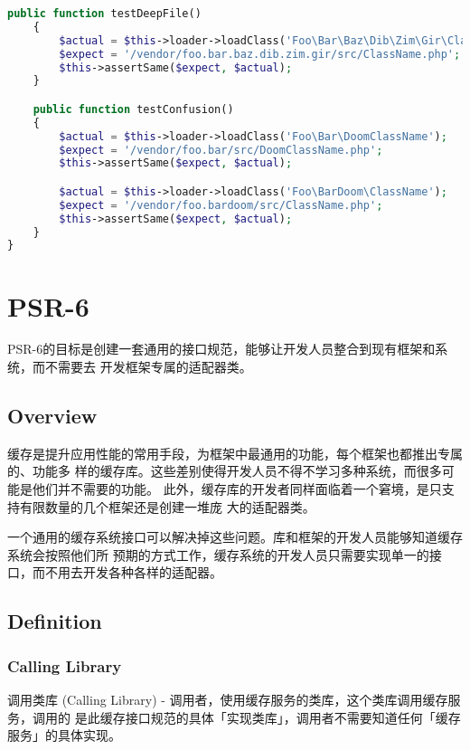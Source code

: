 \begin{lstlisting}[language=PHP]
    public function testDeepFile()
    {
        $actual = $this->loader->loadClass('Foo\Bar\Baz\Dib\Zim\Gir\ClassName');
        $expect = '/vendor/foo.bar.baz.dib.zim.gir/src/ClassName.php';
        $this->assertSame($expect, $actual);
    }

    public function testConfusion()
    {
        $actual = $this->loader->loadClass('Foo\Bar\DoomClassName');
        $expect = '/vendor/foo.bar/src/DoomClassName.php';
        $this->assertSame($expect, $actual);

        $actual = $this->loader->loadClass('Foo\BarDoom\ClassName');
        $expect = '/vendor/foo.bardoom/src/ClassName.php';
        $this->assertSame($expect, $actual);
    }
}
\end{lstlisting}

\chapter{PSR-6}

PSR-6的目标是创建一套通用的接口规范，能够让开发人员整合到现有框架和系统，而不需要去 开发框架专属的适配器类。


\section{Overview}


缓存是提升应用性能的常用手段，为框架中最通用的功能，每个框架也都推出专属的、功能多 样的缓存库。这些差别使得开发人员不得不学习多种系统，而很多可能是他们并不需要的功能。 此外，缓存库的开发者同样面临着一个窘境，是只支持有限数量的几个框架还是创建一堆庞 大的适配器类。

一个通用的缓存系统接口可以解决掉这些问题。库和框架的开发人员能够知道缓存系统会按照他们所 预期的方式工作，缓存系统的开发人员只需要实现单一的接口，而不用去开发各种各样的适配器。


\section{Definition}


\subsection{Calling Library}

调用类库 (Calling Library) - 调用者，使用缓存服务的类库，这个类库调用缓存服务，调用的 是此缓存接口规范的具体「实现类库」，调用者不需要知道任何「缓存服务」的具体实现。




